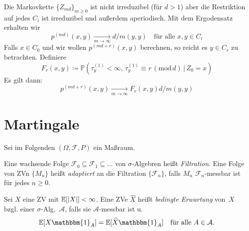 \documentclass{cheat-sheet}
\renewcommand{\P}{\mathbb{P}} %
\newcommand{\E}{\mathbb{E}} %
\newcommand{\ind}{\mathbbm{1}} %
\newcommand{\iid}{i.\,i.\,d.} %
\newcommand{\Filt}{\mathcal{F}} %
\begin{document}
\begin{samepage}

\begin{bem}
  Die Markovkette $\{ Z_{md} \}_{m \geq 0}$ ist nicht irreduzibel (für $d > 1$) aber die Restriktion auf jedes $C_i$ ist irreduzibel und außerdem aperiodisch.
  Mit dem Ergodensatz erhalten wir
  \[
    p^{(md)}(x, y) \xrightarrow[m \to \infty]{} d / m(y, y)
    \quad \text{für alle $x, y \in C_i$}
  \]
  Falls $x \in C_0$ und wir wollen $p^{(md + r)}(x, y)$ berechnen, so reicht es $y \in C_r$ zu betrachten.
  Definiere
  \[
    F_r(x, y) \coloneqq \P(\tau_y^{(1)} < \infty, \, \tau_y^{(1)} \equiv r \, (\mathrm{mod}\, d) \,|\, Z_0 = x)
  \]
  Es gilt dann:
  \[
    p^{(md+r)}(x, y) \xrightarrow[m \to \infty]{} F_r(x, y) d / m(y, y)
  \]
\end{bem}


\columnbreak

\section{Martingale}

\end{samepage}


\begin{setting}
  Sei im Folgenden $(\Omega, \mathcal{F}, P)$ ein Maßraum.
\end{setting}

\begin{defn}
  Eine wachsende Folge $\Filt_0 \subseteq \Filt_1 \subseteq \ldots$ von $\sigma$-Algebren heißt \emph{Filtration}.
  Eine Folge von ZVn $\{ M_n \}$ heißt \emph{adaptiert} an die Filtration $\{ \Filt_n \}$, falls $M_n$ $\Filt_n$-messbar ist für jedes $n \geq 0$.
\end{defn}

\begin{defn}
  Sei $X$ eine ZV mit $\E[\abs{X}] < \infty$.
  Eine ZVe $\widehat{X}$ heißt \emph{bedingte Erwartung} von~$X$ bzgl. einer $\sigma$-Alg.~$\mathcal{A}$, falls sie $\mathcal{A}$-messbar ist u.
  \[
    \E[X \ind_A] = \E[\widehat{X} \ind_A] \quad
    \text{für alle $A \in \mathcal{A}$.}
  \]
\end{defn}
\end{document}
